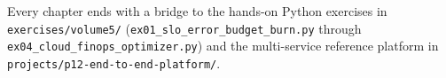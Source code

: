 \documentclass[11pt,oneside]{book}
\begin{document}
\begin{labbridgebox}
Every chapter ends with a bridge to the hands-on Python exercises in \texttt{exercises/volume5/} (\texttt{ex01\_slo\_error\_budget\_burn.py} through \texttt{ex04\_cloud\_finops\_optimizer.py}) and the multi-service reference platform in \texttt{projects/p12-end-to-end-platform/}.
\end{labbridgebox}

\mainmatter










\end{document}
